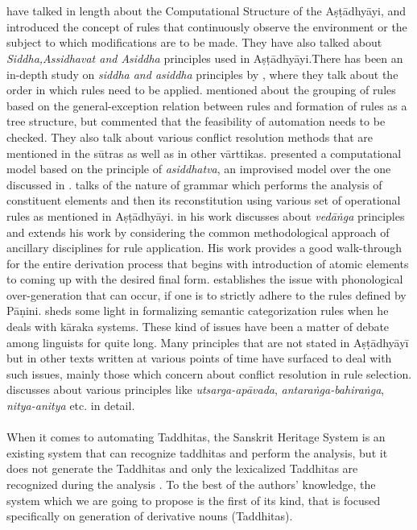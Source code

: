 \documentclass[11pt]{article}
\begin{document}
\\ \\
 have talked in length about the Computational Structure of the Aṣṭādhyāyi, and introduced the concept of rules that continuously observe the environment or the subject to which modifications are to be made. They have also talked about {\sl Siddha,Assidhavat and Asiddha } principles used in Aṣṭādhyāyi.There has been an in-depth study on {\sl siddha and asiddha} principles by , where they talk about the order in which rules need to be applied.  mentioned about the grouping of rules based on the general-exception relation between rules and formation of rules as a tree structure, but commented that the feasibility of automation needs to be checked. They also talk about various conflict resolution methods that are mentioned in the sūtras as well as in other vārttikas.  presented a computational model based on the principle of {\sl asiddhatva}, an improvised model over the one discussed in .  talks of the nature of grammar which performs the analysis of constituent elements and then its reconstitution using various set of operational rules as mentioned in Aṣṭādhyāyi.  in his work discusses about {\sl vedāṅga } principles and extends his work by considering the common methodological approach of ancillary disciplines for rule application. His work provides a good walk-through for the entire derivation process that begins with introduction of atomic elements to coming up with the desired final form.  establishes the issue with phonological over-generation that can occur, if one is to strictly adhere to the rules defined by Pāṇini.  sheds some light in formalizing semantic categorization rules when he deals with kāraka systems. These kind of issues have been a matter of debate among linguists for quite long. Many principles that are not stated in Aṣṭādhyāyī but in other texts written at various points of time have surfaced to deal with such issues, mainly those which concern about conflict resolution in rule selection.  discusses about various principles like {\sl utsarga-apāvada}, {\sl antaraṅga-bahiraṅga}, {\sl nitya-anitya} etc. in detail.
\\ \\
When it comes to automating Taddhitas, the Sanskrit Heritage System is an existing system that can recognize taddhitas and perform the analysis, but it does not generate the Taddhitas and only the lexicalized Taddhitas are recognized during the analysis \cite{goyal2013}. To the best of the authors' knowledge, the system which we are going to propose is the first of its kind, that is focused specifically on generation of derivative nouns (Taddhitas). 
\end{document}
